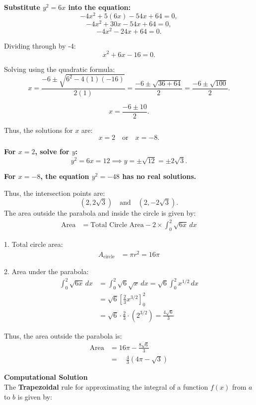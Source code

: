 \documentclass[journal]{IEEEtran}
\begin{document}
\textbf{Substitute \( y^2 = 6x \) into the equation:}
\[
-4x^2 + 5(6x) - 54x + 64 = 0,
\]
\[
-4x^2 + 30x - 54x + 64 = 0,
\]
\[
-4x^2 - 24x + 64 = 0.
\]

Dividing through by -4:
\[
x^2 + 6x - 16 = 0.
\]

Solving using the quadratic formula:
\[
x = \frac{-6 \pm \sqrt{6^2 - 4(1)(-16)}}{2(1)} = \frac{-6 \pm \sqrt{36 + 64}}{2} = \frac{-6 \pm \sqrt{100}}{2}.
\]

\[
x = \frac{-6 \pm 10}{2}.
\]

Thus, the solutions for \( x \) are:
\[
x = 2 \quad \text{or} \quad x = -8.
\]

\textbf{For \( x = 2 \), solve for \( y \):}
\[
y^2 = 6x = 12 \implies y = \pm \sqrt{12} = \pm 2\sqrt{3}.
\]

\textbf{For \( x = -8 \), the equation \( y^2 = -48 \) has no real solutions.}

Thus, the intersection points are:
\[
(2, 2\sqrt{3}) \quad \text{and} \quad (2, -2\sqrt{3}).
\]
The area outside the parabola and inside the circle is given by:
\begin{align*}
\text{Area} &= \text{Total Circle Area} - 2 \times \int_0^2 \sqrt{6x} \, dx
\end{align*}

1. Total circle area:
\begin{align*}
A_{\text{circle}} &= \pi r^2 = 16\pi
\end{align*}

2. Area under the parabola:
\begin{align*}
\int_0^2 \sqrt{6x} \, dx &= \int_0^2 \sqrt{6} \sqrt{x} \, dx = \sqrt{6} \int_0^2 x^{1/2} \, dx \\
&= \sqrt{6} \left[\frac{2}{3}x^{3/2}\right]_0^2 \\
&= \sqrt{6} \cdot \frac{2}{3} \cdot (2^{3/2}) = \frac{4\sqrt{6}}{3}
\end{align*}

Thus, the area outside the parabola is:
\begin{align*}
\text{Area} &= 16\pi - \frac{8\sqrt{6}}{3} \\
&= \quad \frac{4}{3}(4\pi - \sqrt{3})
\end{align*}




\textbf{Computational Solution}\\

The \textbf{Trapezoidal} rule for approximating the integral of a function \(f(x)\) from \(a\) to \(b\) is given by:
\end{document}
